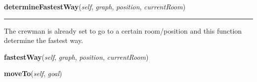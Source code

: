     \label{crewMember:CrewMember:determineFastestWay}

    \vspace{0.5ex}

\hspace{.8\funcindent}\begin{boxedminipage}{\funcwidth}

    \raggedright \textbf{determineFastestWay}(\textit{self}, \textit{graph}, \textit{position}, \textit{currentRoom})

    \vspace{-1.5ex}

    \rule{\textwidth}{0.5\fboxrule}
\setlength{\parskip}{2ex}
    The crewman is already set to go to a certain room/position and this 
    function determine the fastest way.

\setlength{\parskip}{1ex}
    \end{boxedminipage}

    \label{crewMember:CrewMember:fastestWay}

    \vspace{0.5ex}

\hspace{.8\funcindent}\begin{boxedminipage}{\funcwidth}

    \raggedright \textbf{fastestWay}(\textit{self}, \textit{graph}, \textit{position}, \textit{currentRoom})

\setlength{\parskip}{2ex}
\setlength{\parskip}{1ex}
    \end{boxedminipage}

    \label{crewMember:CrewMember:moveTo}

    \vspace{0.5ex}

\hspace{.8\funcindent}\begin{boxedminipage}{\funcwidth}

    \raggedright \textbf{moveTo}(\textit{self}, \textit{goal})

\setlength{\parskip}{2ex}
\setlength{\parskip}{1ex}
    \end{boxedminipage}


